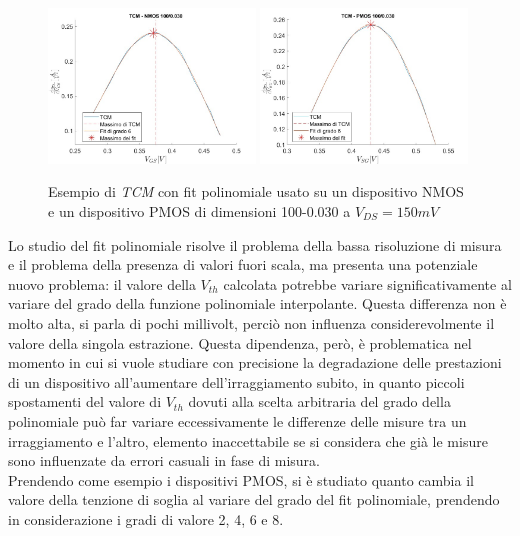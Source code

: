 \documentclass[12pt, letterpaper]{book}
\begin{document}
\begin{figure}[H]
  \centering
  \includegraphics[width=0.49\textwidth]{TCM-N4-100-30}
  \includegraphics[width=0.49\textwidth]{TCM-P1-100-30}
  \caption{Esempio di \emph{TCM} con fit polinomiale usato su un dispositivo NMOS e un dispositivo PMOS di dimensioni 100-0.030 a $V_{DS} = 150 mV$}
\end{figure}

Lo
studio del fit polinomiale risolve il problema della bassa risoluzione di misura e il problema della presenza di valori fuori scala, ma presenta una potenziale nuovo problema: il valore della $V_{th}$ calcolata potrebbe variare significativamente al variare del grado della funzione polinomiale interpolante. Questa differenza non è molto alta, si parla di pochi millivolt, perciò non influenza considerevolmente il valore della singola estrazione. Questa dipendenza, però, è problematica nel momento in cui si vuole studiare con precisione la degradazione delle prestazioni di un dispositivo all'aumentare dell'irraggiamento subito, in quanto piccoli spostamenti del valore di $V_{th}$ dovuti alla scelta arbitraria del grado della polinomiale può far variare eccessivamente le differenze delle misure tra un irraggiamento e l'altro, elemento inaccettabile se si considera che già le misure sono influenzate da errori casuali in fase di misura.\\
Prendendo come esempio i dispositivi PMOS, si è studiato quanto cambia il valore della tenzione di soglia al variare del grado del fit polinomiale, prendendo in considerazione i gradi di valore 2, 4, 6 e 8.\\
\end{document}
